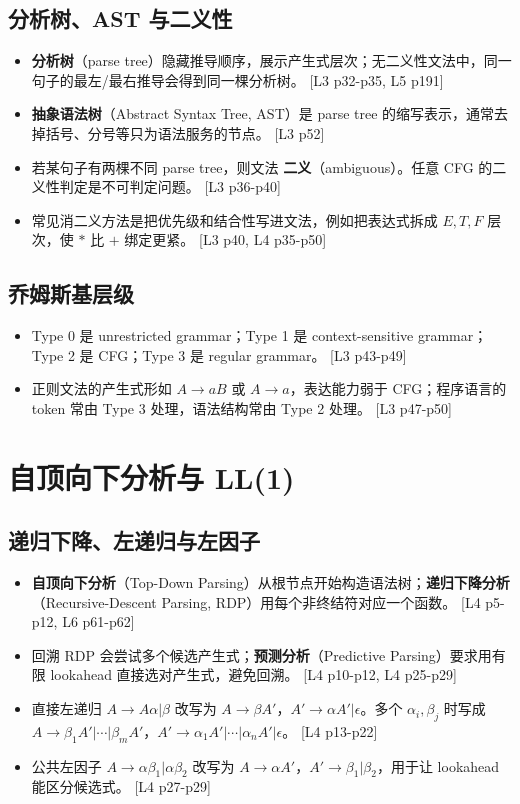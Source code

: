 \documentclass[UTF8,fontset=none,11pt]{ctexart}
\newcommand{\pg}[1]{{\scriptsize\textcolor{citegray}{[#1]}}}
\newcommand{\term}[2]{\textbf{#1}（#2）}
\begin{document}
\subsection{分析树、AST 与二义性}

\begin{itemize}
  \item \term{分析树}{parse tree}隐藏推导顺序，展示产生式层次；无二义性文法中，同一句子的最左/最右推导会得到同一棵分析树。 \pg{L3 p32-p35, L5 p191}
  \item \term{抽象语法树}{Abstract Syntax Tree, AST}是 parse tree 的缩写表示，通常去掉括号、分号等只为语法服务的节点。 \pg{L3 p52}
  \item 若某句子有两棵不同 parse tree，则文法 \term{二义}{ambiguous}。任意 CFG 的二义性判定是不可判定问题。 \pg{L3 p36-p40}
  \item 常见消二义方法是把优先级和结合性写进文法，例如把表达式拆成 \(E,T,F\) 层次，使 \(*\) 比 \(+\) 绑定更紧。 \pg{L3 p40, L4 p35-p50}
\end{itemize}

\subsection{乔姆斯基层级}

\begin{itemize}
  \item Type 0 是 unrestricted grammar；Type 1 是 context-sensitive grammar；Type 2 是 CFG；Type 3 是 regular grammar。 \pg{L3 p43-p49}
  \item 正则文法的产生式形如 \(A\to aB\) 或 \(A\to a\)，表达能力弱于 CFG；程序语言的 token 常由 Type 3 处理，语法结构常由 Type 2 处理。 \pg{L3 p47-p50}
\end{itemize}

\section{自顶向下分析与 LL(1)}

\subsection{递归下降、左递归与左因子}

\begin{itemize}
  \item \term{自顶向下分析}{Top-Down Parsing}从根节点开始构造语法树；\term{递归下降分析}{Recursive-Descent Parsing, RDP}用每个非终结符对应一个函数。 \pg{L4 p5-p12, L6 p61-p62}
  \item 回溯 RDP 会尝试多个候选产生式；\term{预测分析}{Predictive Parsing}要求用有限 lookahead 直接选对产生式，避免回溯。 \pg{L4 p10-p12, L4 p25-p29}
  \item 直接左递归 \(A\to A\alpha|\beta\) 改写为 \(A\to\beta A'\)，\(A'\to\alpha A'|\epsilon\)。多个 \(\alpha_i,\beta_j\) 时写成 \(A\to\beta_1A'|\cdots|\beta_mA'\)，\(A'\to\alpha_1A'|\cdots|\alpha_nA'|\epsilon\)。 \pg{L4 p13-p22}
  \item 公共左因子 \(A\to\alpha\beta_1|\alpha\beta_2\) 改写为 \(A\to\alpha A'\)，\(A'\to\beta_1|\beta_2\)，用于让 lookahead 能区分候选式。 \pg{L4 p27-p29}
\end{itemize}
\end{document}
